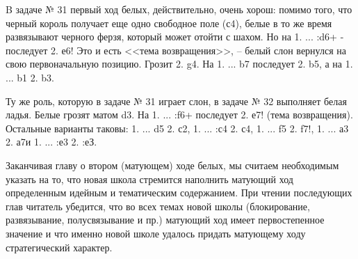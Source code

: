 B задаче № 31 первый ход белых, действительно, очень хорош: помимо того, что черный король получает еще одно свободное поле (с4), белые в то же время развязывают черного ферзя, который может отойти с шахом. Но на 1. ... \queen{}:d6+ - последует 2. \bishop{}е6\mate! Это и есть <<тема возвращения>>, -- белый слон вернулся на свою первоначальную позицию. Грозит 2. \queen{}g4. На 1. ... \queen{}b7 последует 2. \bishop{}b5\mate, а на 1. ... \queen{}b1 2. \bishop{}b3\mate.

Ту же роль, которую в задаче № 31 играет слон, в задаче № 32 выполняет белая ладья. Белые грозят матом \rook{}d3. На 1. ... \queen{}:f6+ последует 2. \rook{}е7\mate! (тема возвращения). Остальные варианты таковы: 1. ... \rook{} d5 2. \knight{}с2\mate, 1. ... \knight{}:с4 2. \rook{}с4\mate, 1. ... \bishop{}f5 2. f7\mate!, 1. ... \rook{}а3 2. \queen{}а7\mate и 1. ... \queen{}:е3 2. \bishop{}:еЗ\mate.

Заканчивая главу о втором (матующем) ходе белых, мы считаем необходимым указать на то, что новая школа стремится наполнить матующий ход определенным идейным и тематическим содержанием. При чтении последующих глав читатель убедится, что во всех темах новой школы (блокирование, развязывание, полусвязывание и пр.) матующий ход имеет первостепенное значение и что именно новой школе удалось придать матующему ходу стратегический характер.
